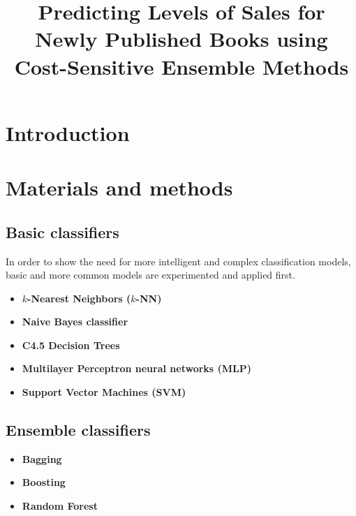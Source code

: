 \documentclass{llncs}
\title{Predicting Levels of Sales for Newly Published Books using Cost-Sensitive Ensemble Methods}
\author {}
\institute{}
\date{}
\begin{document}
\maketitle

\begin{abstract}

\end{abstract}



\section{Introduction}


\section{Materials and methods}
\subsection{Basic classifiers}


In order to show the need for more intelligent and complex classification models, basic and more common models are experimented and applied first. 
\begin{itemize}

\item \textbf{$k$-Nearest Neighbors ($k$-NN)}

\item \textbf{Naive Bayes classifier}

\item \textbf{C4.5 Decision Trees}


\item \textbf{Multilayer Perceptron neural networks (MLP)}

\item \textbf{Support Vector Machines (SVM)}


\end{itemize}






\subsection{Ensemble classifiers}

\begin{itemize}
\item \textbf{Bagging}
\item \textbf{Boosting}
\item \textbf{Random Forest}
\end{itemize}
\end{document}
